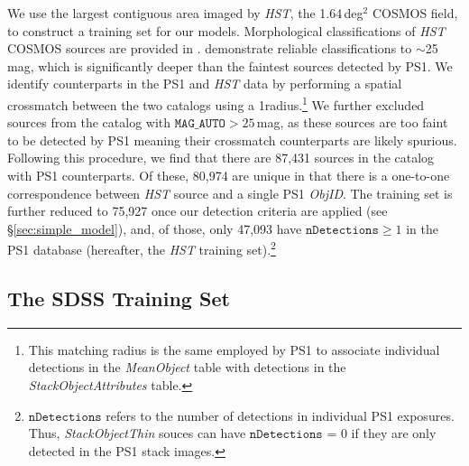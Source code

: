 \documentclass[twocolumn]{aastex62}
\begin{document}
We use the largest contiguous area imaged by \textit{HST}, the 1.64\,deg$^2$
COSMOS field, to construct a training set for our models. Morphological
classifications of \textit{HST} COSMOS sources are provided in
\citet{Leauthaud07}. \citeauthor{Leauthaud07} demonstrate reliable
classifications to $\sim$25\,mag, which is significantly deeper than the
faintest sources detected by PS1. We identify counterparts in the PS1 and
\textit{HST} data by performing a spatial crossmatch between the two catalogs
using a 1\arcsec radius.\footnote{This matching radius is the same employed
by PS1 to associate individual detections in the \textit{MeanObject} table
with detections in the \textit{StackObjectAttributes} table.} We further
excluded sources from the \citet{Leauthaud07} catalog with
$\texttt{MAG\_AUTO} > 25$\,mag, as these sources are too faint to be detected
by PS1 meaning their crossmatch counterparts are likely spurious. Following
this procedure, we find that there are 87,431 sources in the
\citet{Leauthaud07} catalog with PS1 counterparts. Of these, 80,974 are
unique in that there is a one-to-one correspondence between \textit{HST}
source and a single PS1 \textit{ObjID}. The training set is further reduced
to 75,927 once our detection criteria are applied (see
\S\ref{sec:simple_model}), and, of those, only 47,093 have
$\texttt{nDetections} \ge 1$ in the PS1 database (hereafter, the \textit{HST}
training set).\footnote{$\texttt{nDetections}$ refers to the number of
detections in individual PS1 exposures. Thus, \textit{StackObjectThin} souces
can have $\texttt{nDetections}$ = 0 if they are only detected in the PS1
stack images.}

\subsection{The SDSS Training Set}\label{sec:sdss}
\end{document}
